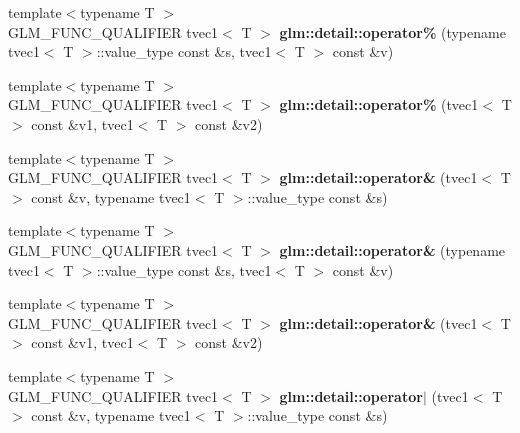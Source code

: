 \begin{DoxyCompactItemize}
\item 
\hypertarget{namespaceglm_1_1detail_acb767b9c9d814e3c3fcbff24c3ad782e}{{\footnotesize template$<$typename T $>$ }\\G\-L\-M\-\_\-\-F\-U\-N\-C\-\_\-\-Q\-U\-A\-L\-I\-F\-I\-E\-R tvec1$<$ T $>$ {\bfseries glm\-::detail\-::operator\%} (typename tvec1$<$ T $>$\-::value\-\_\-type const \&s, tvec1$<$ T $>$ const \&v)}\label{namespaceglm_1_1detail_acb767b9c9d814e3c3fcbff24c3ad782e}

\item 
\hypertarget{namespaceglm_1_1detail_abb8594c67ded240d2a15ba2459a87091}{{\footnotesize template$<$typename T $>$ }\\G\-L\-M\-\_\-\-F\-U\-N\-C\-\_\-\-Q\-U\-A\-L\-I\-F\-I\-E\-R tvec1$<$ T $>$ {\bfseries glm\-::detail\-::operator\%} (tvec1$<$ T $>$ const \&v1, tvec1$<$ T $>$ const \&v2)}\label{namespaceglm_1_1detail_abb8594c67ded240d2a15ba2459a87091}

\item 
\hypertarget{namespaceglm_1_1detail_a4f1e2d9d9ca8fbd5a226683bcbe1a857}{{\footnotesize template$<$typename T $>$ }\\G\-L\-M\-\_\-\-F\-U\-N\-C\-\_\-\-Q\-U\-A\-L\-I\-F\-I\-E\-R tvec1$<$ T $>$ {\bfseries glm\-::detail\-::operator\&} (tvec1$<$ T $>$ const \&v, typename tvec1$<$ T $>$\-::value\-\_\-type const \&s)}\label{namespaceglm_1_1detail_a4f1e2d9d9ca8fbd5a226683bcbe1a857}

\item 
\hypertarget{namespaceglm_1_1detail_a29075e784ca50a7e63be34662cb6c225}{{\footnotesize template$<$typename T $>$ }\\G\-L\-M\-\_\-\-F\-U\-N\-C\-\_\-\-Q\-U\-A\-L\-I\-F\-I\-E\-R tvec1$<$ T $>$ {\bfseries glm\-::detail\-::operator\&} (typename tvec1$<$ T $>$\-::value\-\_\-type const \&s, tvec1$<$ T $>$ const \&v)}\label{namespaceglm_1_1detail_a29075e784ca50a7e63be34662cb6c225}

\item 
\hypertarget{namespaceglm_1_1detail_abeb95a2e5d0c64e7e90b3a8ee8a3be04}{{\footnotesize template$<$typename T $>$ }\\G\-L\-M\-\_\-\-F\-U\-N\-C\-\_\-\-Q\-U\-A\-L\-I\-F\-I\-E\-R tvec1$<$ T $>$ {\bfseries glm\-::detail\-::operator\&} (tvec1$<$ T $>$ const \&v1, tvec1$<$ T $>$ const \&v2)}\label{namespaceglm_1_1detail_abeb95a2e5d0c64e7e90b3a8ee8a3be04}

\item 
\hypertarget{namespaceglm_1_1detail_a2dd5b31e72e98dd829d0c59e444cde9f}{{\footnotesize template$<$typename T $>$ }\\G\-L\-M\-\_\-\-F\-U\-N\-C\-\_\-\-Q\-U\-A\-L\-I\-F\-I\-E\-R tvec1$<$ T $>$ {\bfseries glm\-::detail\-::operator$\vert$} (tvec1$<$ T $>$ const \&v, typename tvec1$<$ T $>$\-::value\-\_\-type const \&s)}\label{namespaceglm_1_1detail_a2dd5b31e72e98dd829d0c59e444cde9f}


\end{DoxyCompactItemize}
